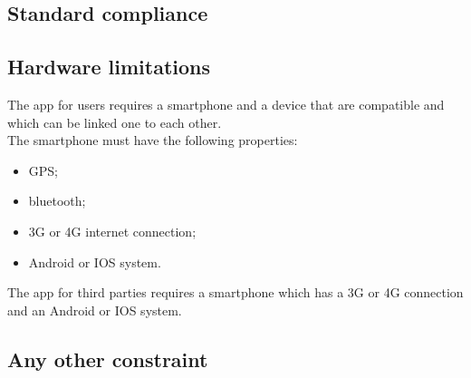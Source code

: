 \subsection{Standard compliance}

\subsection{Hardware limitations}
The app for users requires a smartphone and a device that are compatible and which can be linked one to each other.\\
The smartphone must have the following properties:
\begin{itemize}
	\item GPS;
	\item bluetooth;
	\item 3G or 4G internet connection;
	\item Android or IOS system.

\end{itemize}The app for third parties requires a smartphone which has a 3G or 4G connection and an Android or IOS system.

\subsection{Any other constraint}